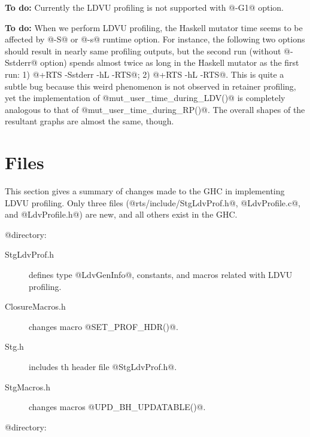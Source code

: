 \documentclass{article}
\begin{document}
\textbf{To do:} Currently the LDVU profiling is not supported with @-G1@ option.

\textbf{To do:} When we perform LDVU profiling, the Haskell mutator time seems to
be affected by @-S@ or @-s@ runtime option. For instance, the following 
two options should result in nearly same profiling outputs, but
the second run (without @-Sstderr@ option) spends almost twice as
long in the Haskell mutator as the first run:
1) @+RTS -Sstderr -hL -RTS@; 2) @+RTS -hL -RTS@.
This is quite a subtle bug because this weird phenomenon is not 
observed in retainer profiling, yet the implementation of 
@mut_user_time_during_LDV()@ is completely analogous to that of 
@mut_user_time_during_RP()@. The overall shapes of the resultant graphs 
are almost the same, though.

\section{Files}

This section gives a summary of changes made to the GHC in 
implementing LDVU profiling.
Only three files (@rts/include/StgLdvProf.h@, @LdvProfile.c@, and 
@LdvProfile.h@) are new, and all others exist in the GHC.

@\rts@ directory:

\begin{description}
\item[StgLdvProf.h] defines type @LdvGenInfo@, constants, and macros related
with LDVU profiling.
\item[ClosureMacros.h] changes macro @SET_PROF_HDR()@.
\item[Stg.h] includes th header file @StgLdvProf.h@.
\item[StgMacros.h] changes macros @UPD_BH_UPDATABLE()@.
\end{description}

@\rts@ directory:
\end{document}
